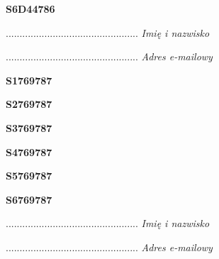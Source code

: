 \begin{turn}{90}\huge \textbf{S6D44786}\end{turn}

\begin{turn}{90}\begin{minipage}{\linewidth} \vspace{20mm} ................................................  \textit{Imię i nazwisko}\end{minipage}\end{turn}

\begin{turn}{90}\begin{minipage}{\linewidth} \vspace{20mm} ................................................  \textit{Adres e-mailowy}\end{minipage}\end{turn}

\begin{turn}{90}\huge \textbf{S1769787}\end{turn}

\begin{turn}{90}\huge \textbf{S2769787}\end{turn}

\begin{turn}{90}\huge \textbf{S3769787}\end{turn}

\begin{turn}{90}\huge \textbf{S4769787}\end{turn}

\begin{turn}{90}\huge \textbf{S5769787}\end{turn}

\begin{turn}{90}\huge \textbf{S6769787}\end{turn}

\begin{turn}{90}\begin{minipage}{\linewidth} \vspace{20mm} ................................................  \textit{Imię i nazwisko}\end{minipage}\end{turn}

\begin{turn}{90}\begin{minipage}{\linewidth} \vspace{20mm} ................................................  \textit{Adres e-mailowy}\end{minipage}\end{turn}

